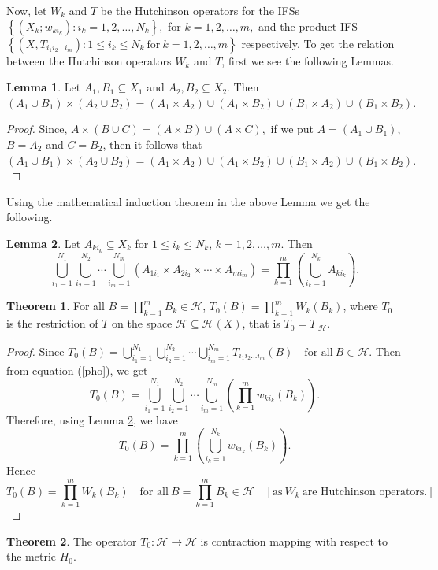 \documentclass[10pt]{amsart}
\theoremstyle{definition}
\newtheorem{thm}{Theorem}[section]
\newtheorem{lm}{Lemma}[section]
\begin{document}
	Now, let $W_k$ and $T$ be the Hutchinson operators for the IFSs $\left\{(X_k;w_{ki_k}):i_k=1,2,\ldots,N_k\right\},$ for $k=1,2,\ldots,m,$ and the product IFS $\left\{(X,T_{i_1i_2\ldots i_m}):1\leq i_k\leq N_k~\mbox{for}~k=1,2,\ldots,m\right\}$ respectively. To get the relation between the Hutchinson operators $W_k$ and $T$, first we see the following Lemmas.
	\begin{lm}
		Let $A_1,B_1\subseteq X_1$ and $A_2,B_2\subseteq X_2$. Then $(A_1\cup B_1)\times(A_2\cup B_2)=(A_1\times A_2)\cup (A_1\times B_2)\cup (B_1\times A_2)\cup (B_1\times B_2).$
	\end{lm}
	\begin{proof}
		Since, $A\times (B\cup C)=(A\times B)\cup (A\times C),$  if we put $A=(A_1\cup B_1)$, $B=A_2$ and $C=B_2$, then it follows that $(A_1\cup B_1)\times(A_2\cup B_2)=(A_1\times A_2)\cup (A_1\times B_2)\cup (B_1\times A_2)\cup (B_1\times B_2).$
	\end{proof}
	Using the mathematical induction theorem in the above Lemma we get the following.
	\begin{lm}
		Let $A_{ki_k}\subseteq X_k$ for $1\leq i_k\leq N_k$, $k=1,2,\ldots,m.$ Then
		$$ \bigcup_{i_1=1}^{N_1}\bigcup_{i_2=1}^{N_2}\cdots\bigcup_{i_m=1}^{N_m}\left(A_{1i_1}\times A_{2i_2}\times\cdots\times A_{mi_m}\right)=\prod_{k=1}^{m}\left(\bigcup_{i_k=1}^{N_k}A_{ki_k}\right).$$
		\label{pl}
	\end{lm}
	\begin{thm}
		For all $B=\prod_{k=1}^mB_k\in \mathscr{H}$, $T_0(B)=\prod_{k=1}^mW_k(B_k)$, where $T_0$ is the restriction of $T$ on the space $\mathscr{H}\subseteq \mathscr{H}(X)$, that is $T_0=T_{|\mathscr{H}}$.
		\label{rbho}
	\end{thm}
	\begin{proof}
		Since $T_0(B)=\bigcup_{i_1=1}^{N_1}\bigcup_{i_2=1}^{N_2}\cdots\bigcup_{i_m=1}^{N_m}T_{i_1i_2\ldots i_m}(B)\quad \mbox{for all}~B\in\mathscr{H}.$ Then from equation (\ref{pho}), we get $$T_0(B)=\bigcup_{i_1=1}^{N_1}\bigcup_{i_2=1}^{N_2}\cdots\bigcup_{i_m=1}^{N_m}\left(\prod_{k=1}^mw_{ki_k}(B_k)\right).$$
		Therefore, using Lemma \ref{pl}, we have
		$$
		T_0(B)=\prod_{k=1}^{m}\left(\bigcup_{i_k=1}^{N_k}w_{ki_k}(B_k)\right).$$
		Hence $$T_0(B)=\prod_{k=1}^{m}W_k(B_k)\quad \mbox{for all}~B=\prod_{k=1}^mB_k\in \mathscr{H}\quad [\mbox{as}~W_k~\mbox{are Hutchinson operators.}]$$
	\end{proof}
	\begin{thm}
		The operator $T_0:\mathscr{H}\rightarrow\mathscr{H}$ is contraction mapping with respect to the metric $H_0$.
		\label{conofpho}
	\end{thm}
\end{document}
